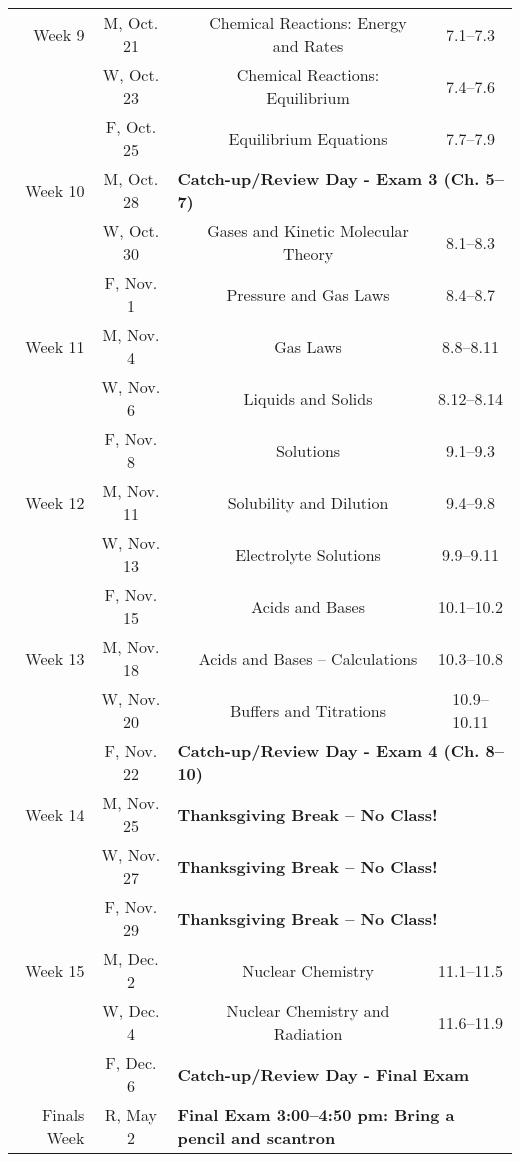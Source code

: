 \begin{tabular}{rcccc}
\midrule
Week 9 & M, Oct. 21&& Chemical Reactions: Energy and Rates & 7.1--7.3\\
& W, Oct. 23&& Chemical Reactions: Equilibrium & 7.4--7.6\\
& F, Oct. 25&& Equilibrium Equations & 7.7--7.9\\
\midrule
Week 10 & M, Oct. 28& \multicolumn{3}{l}{\textbf{Catch-up/Review Day - Exam 3 (Ch. 5--7)}}\\
& W, Oct. 30&& Gases and Kinetic Molecular Theory & 8.1--8.3\\
& F, Nov. 1&& Pressure and Gas Laws & 8.4--8.7\\
\midrule
Week 11 & M, Nov. 4&& Gas Laws & 8.8--8.11\\
& W, Nov. 6&& Liquids and Solids & 8.12--8.14\\
& F, Nov. 8&& Solutions & 9.1--9.3\\
\midrule
Week 12 & M, Nov. 11&& Solubility and Dilution & 9.4--9.8\\
& W, Nov. 13&& Electrolyte Solutions & 9.9--9.11\\
& F, Nov. 15&& Acids and Bases & 10.1--10.2\\
\midrule
Week 13 & M, Nov. 18&& Acids and Bases -- Calculations & 10.3--10.8\\
& W, Nov. 20&& Buffers and Titrations & 10.9--10.11\\
& F, Nov. 22& \multicolumn{3}{l}{\textbf{Catch-up/Review Day - Exam 4 (Ch. 8--10)}}\\
\midrule
Week 14 & M, Nov. 25& \multicolumn{3}{l}{\textbf{Thanksgiving Break -- No Class!}}\\
& W, Nov. 27& \multicolumn{3}{l}{\textbf{Thanksgiving Break -- No Class!}}\\
& F, Nov. 29& \multicolumn{3}{l}{\textbf{Thanksgiving Break -- No Class!}}\\
\midrule
Week 15 & M, Dec. 2&& Nuclear Chemistry & 11.1--11.5\\
& W, Dec. 4&& Nuclear Chemistry and Radiation & 11.6--11.9\\
& F, Dec. 6& \multicolumn{3}{l}{\textbf{Catch-up/Review Day - Final Exam}}\\
\midrule
Finals Week& R, May 2& \multicolumn{3}{l}{\textbf{Final Exam 3:00--4:50 pm: Bring a pencil and scantron}}\\
\end{tabular}